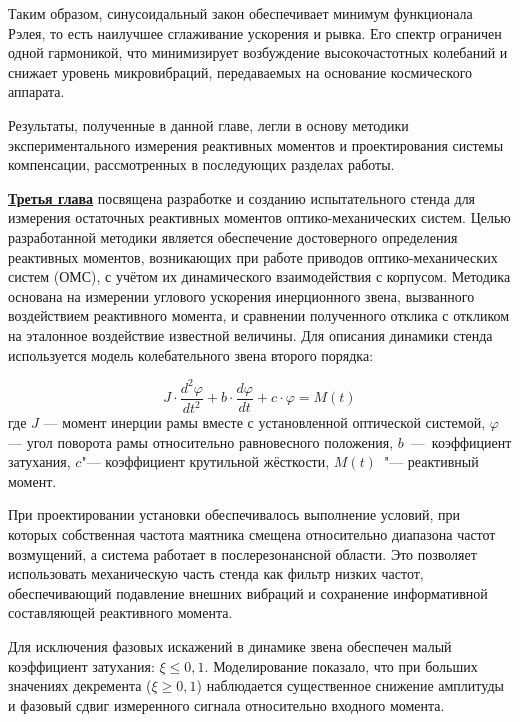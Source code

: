 Таким образом, синусоидальный закон обеспечивает минимум функционала Рэлея, то есть наилучшее сглаживание ускорения и рывка. Его спектр ограничен одной гармоникой, что минимизирует возбуждение высокочастотных колебаний и снижает уровень микровибраций, передаваемых на основание космического аппарата.

Результаты, полученные в данной главе, легли в основу методики экспериментального измерения реактивных моментов и проектирования системы компенсации, рассмотренных в последующих разделах работы.



\underline{\textbf{Третья глава}} посвящена разработке и созданию испытательного стенда для измерения остаточных реактивных моментов оптико-механических систем.
Целью разработанной методики является обеспечение достоверного определения реактивных моментов, возникающих при работе приводов оптико-механических систем (ОМС), с учётом их динамического взаимодействия с корпусом. Методика основана на измерении углового ускорения инерционного звена, вызванного воздействием реактивного момента, и сравнении полученного отклика с откликом на эталонное воздействие известной величины.
Для описания динамики стенда используется модель колебательного звена второго порядка:
\begin{samepage}
	\begin{equation*}
		\label{eq:stadeq}
		J\cdot \frac{d^2\varphi}{dt^2}+b \cdot \frac{d\varphi}{dt}+ c \cdot \varphi = M(t)
	\end{equation*}
	где \(J\) --- момент инерции рамы вместе с установленной оптической системой, \(\varphi\) --- угол поворота рамы относительно равновесного положения, \(b\)~---~коэффициент затухания, \(c\)"--- коэффициент крутильной жёсткости, \(M(t)\)~"--- реактивный момент.
	\end{samepage}


При проектировании установки обеспечивалось выполнение условий, при которых собственная частота маятника смещена относительно диапазона частот возмущений, а система работает в послерезонансной области. Это позволяет использовать механическую часть стенда как фильтр низких частот, обеспечивающий подавление внешних вибраций и сохранение информативной составляющей реактивного момента.

Для исключения фазовых искажений в динамике звена обеспечен малый коэффициент затухания: $\xi\leq 0,1$. Моделирование показало, что при больших значениях декремента ($\xi \geq 0,1 $) наблюдается существенное снижение амплитуды и фазовый сдвиг измеренного сигнала относительно входного момента.

